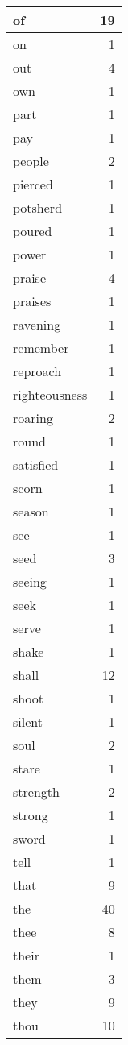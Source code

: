 \begin{center}
\begin{longtable}{l|r}
of & 19 \\ \hline
on & 1 \\ \hline
out & 4 \\ \hline
own & 1 \\ \hline
part & 1 \\ \hline
pay & 1 \\ \hline
people & 2 \\ \hline
pierced & 1 \\ \hline
potsherd & 1 \\ \hline
poured & 1 \\ \hline
power & 1 \\ \hline
praise & 4 \\ \hline
praises & 1 \\ \hline
ravening & 1 \\ \hline
remember & 1 \\ \hline
reproach & 1 \\ \hline
righteousness & 1 \\ \hline
roaring & 2 \\ \hline
round & 1 \\ \hline
satisfied & 1 \\ \hline
scorn & 1 \\ \hline
season & 1 \\ \hline
see & 1 \\ \hline
seed & 3 \\ \hline
seeing & 1 \\ \hline
seek & 1 \\ \hline
serve & 1 \\ \hline
shake & 1 \\ \hline
shall & 12 \\ \hline
shoot & 1 \\ \hline
silent & 1 \\ \hline
soul & 2 \\ \hline
stare & 1 \\ \hline
strength & 2 \\ \hline
strong & 1 \\ \hline
sword & 1 \\ \hline
tell & 1 \\ \hline
that & 9 \\ \hline
the & 40 \\ \hline
thee & 8 \\ \hline
their & 1 \\ \hline
them & 3 \\ \hline
they & 9 \\ \hline
thou & 10 \\ \hline

\end{longtable}
\end{center}
